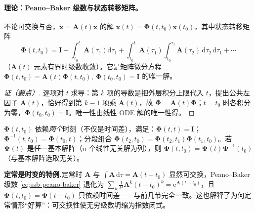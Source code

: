 \paragraph{理论：Peano--Baker 级数与状态转移矩阵。}
\begin{theorem}\label{thm:ssb-peano-baker}
不论可交换与否，$\dot{\mathbf{x}}=\mathbf{A}(t)\mathbf{x}$ 的解 $\mathbf{x}(t)=\boldsymbol{\Phi}(t,t_0)\mathbf{x}(t_0)$，其中状态转移矩阵
\begin{equation}
  \boldsymbol{\Phi}(t,t_0)=\mathbf{I}+\int_{t_0}^t\!\mathbf{A}(\tau_1)\mathrm{d}\tau_1+\int_{t_0}^t\!\mathbf{A}(\tau_1)\!\int_{t_0}^{\tau_1}\!\mathbf{A}(\tau_2)\,\mathrm{d}\tau_2\,\mathrm{d}\tau_1+\cdots
  \label{eq:ssb-peano-baker}
\end{equation}
（$\mathbf{A}(t)$ 元素有界时级数收敛）。它是矩阵微分方程 $\dot{\boldsymbol{\Phi}}(t,t_0)=\mathbf{A}(t)\boldsymbol{\Phi}(t,t_0),\ \boldsymbol{\Phi}(t_0,t_0)=\mathbf{I}$ 的唯一解。
\end{theorem}
\begin{proof}[证（要点）]
逐项对 $t$ 求导：第 $k$ 项的导数是把外层积分上限代入 $t$，提出公共左因子 $\mathbf{A}(t)$，恰好得到第 $k-1$ 项乘 $\mathbf{A}(t)$，故 $\dot{\boldsymbol{\Phi}}=\mathbf{A}(t)\boldsymbol{\Phi}$；$t=t_0$ 时各积分为零，$\boldsymbol{\Phi}(t_0,t_0)=\mathbf{I}$。唯一性由线性 ODE 解的唯一性得。
\end{proof}

\begin{definition}[时变状态转移矩阵的性质]\label{def:ssb-ltv-stm}
$\boldsymbol{\Phi}(t,t_0)$ 依赖\emph{两个}时刻（不仅是时间差），满足：$\boldsymbol{\Phi}(t,t)=\mathbf{I}$；$\boldsymbol{\Phi}^{-1}(t,t_0)=\boldsymbol{\Phi}(t_0,t)$；分段组合 $\boldsymbol{\Phi}(t_2,t_0)=\boldsymbol{\Phi}(t_2,t_1)\boldsymbol{\Phi}(t_1,t_0)$。若 $\boldsymbol{\Psi}(t)$ 是任一基本解阵（$n$ 个线性无关解为列），则 $\boldsymbol{\Phi}(t,t_0)=\boldsymbol{\Psi}(t)\boldsymbol{\Psi}^{-1}(t_0)$（与基本解阵选取无关）。
\end{definition}

\begin{note}
\textbf{定常是时变的特例.}\;定常时 $\mathbf{A}$ 与 $\int\mathbf{A}\,\mathrm{d}\tau=\mathbf{A}(t-t_0)$ 显然可交换，Peano--Baker 级数 \cref{eq:ssb-peano-baker} 退化为 $\sum_k\tfrac{1}{k!}\mathbf{A}^k(t-t_0)^k=\mathrm{e}^{\mathbf{A}(t-t_0)}$，且 $\boldsymbol{\Phi}(t,t_0)=\boldsymbol{\Phi}(t-t_0)$ 只依赖时间差——与前几节完全一致。这也解释了为何定常情形“好算”：可交换性使无穷级数坍缩为指数闭式。
\end{note}

